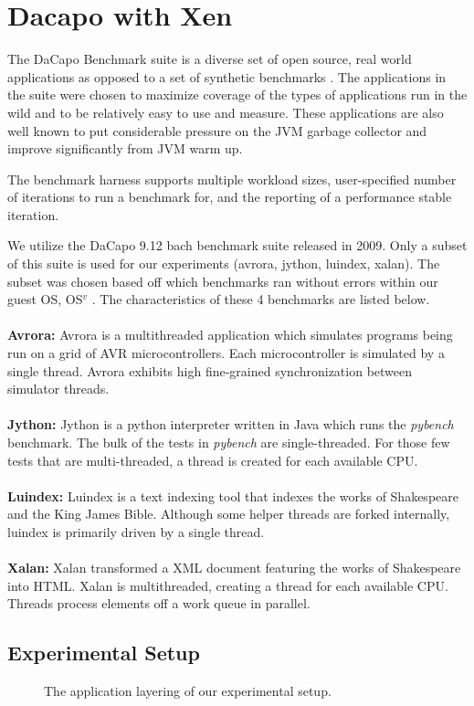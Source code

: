 \documentclass{sig-alternate}
\begin{document}
\section{Dacapo with Xen} \label{sec:dacapo}
The DaCapo Benchmark suite is a diverse set of open source, real world applications as opposed to a set of synthetic benchmarks \cite{blackburn2006dacapo}. The applications in the suite were chosen to maximize coverage of the types of applications run in the wild and to be relatively easy to use and measure. These applications are also well known to put considerable pressure on the JVM garbage collector and improve significantly from JVM warm up. 

The benchmark harness supports multiple workload sizes, user-specified number of iterations to run a benchmark for, and the reporting of a performance stable iteration.

We utilize the DaCapo 9.12 bach benchmark suite released in 2009. Only a subset of this suite is used for our experiments (avrora, jython, luindex, xalan). The subset was chosen based off which benchmarks ran without errors within our guest OS, OS$^{v}$ \cite{aviOSv2014}. The characteristics of these 4 benchmarks are listed below.
\\\\
\textbf{Avrora:} Avrora is a multithreaded application which simulates programs being run on a grid of AVR microcontrollers. Each microcontroller is simulated by a single thread. Avrora exhibits high fine-grained synchronization between simulator threads.
\\\\
\textbf{Jython:} Jython is a python interpreter written in Java which runs the \textit{pybench} benchmark. The bulk of the tests in \textit{pybench} are single-threaded. For those few tests that are multi-threaded, a thread is created for each available CPU. 
\\\\
\textbf{Luindex:} Luindex is a text indexing tool that indexes the works of Shakespeare and the King James Bible. Although some helper threads are forked internally, luindex is primarily driven by a single thread.
\\\\
\textbf{Xalan:} Xalan transformed a XML document featuring the works of Shakespeare into HTML. Xalan is multithreaded, creating a thread for each available CPU. Threads process elements off a work queue in parallel.

\subsection{Experimental Setup}\label{subsec:expsetup}
\begin{figure}
\centering
{}
\caption{The application layering of our experimental setup.}
\label{fig:dacaposetup}
\end{figure}
\end{document}
